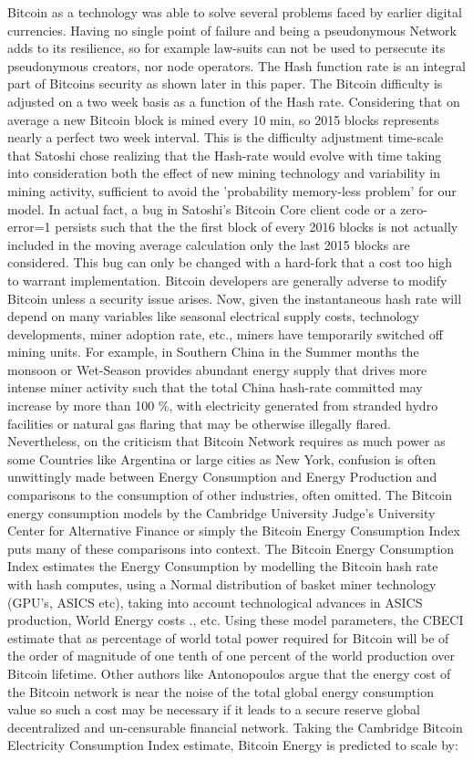 \documentclass[final,5p,times,twocolumn,authoryear]{elsarticle}
\begin{document}
Bitcoin as a technology was able to solve several problems faced by earlier digital currencies. Having no single point of failure and being a pseudonymous Network adds to its resilience, so for example law-suits can not be used to persecute its pseudonymous creators, nor node operators. The Hash function rate is an integral part of Bitcoins security as shown later in this paper. The Bitcoin difficulty is adjusted on a two week basis as a function of the Hash rate. Considering that on average a new Bitcoin block is mined every 10 min, so 2015 blocks represents nearly a perfect two week interval. This is the difficulty adjustment time-scale that Satoshi chose realizing that the Hash-rate would evolve with time taking into consideration both the effect of new mining technology and variability in mining activity, sufficient to avoid the 'probability memory-less problem' for our model. In actual fact, a bug in Satoshi's Bitcoin Core client code or a zero-error=1 persists such that the the first block of every 2016 blocks is not actually included in the moving average calculation only the last 2015 blocks are considered. This bug can only be changed with a hard-fork that a cost too high to warrant implementation. Bitcoin developers are generally adverse to modify Bitcoin unless a security issue arises. Now, given the instantaneous hash rate will depend on many variables like seasonal electrical supply costs, technology developments, miner adoption rate, etc., miners have temporarily switched off mining units. For example, in Southern China in the Summer months the monsoon or Wet-Season provides abundant energy supply that drives more intense miner activity such that the total China hash-rate committed may increase by more than 100 \%, with electricity generated from stranded hydro facilities or natural gas flaring that may be otherwise illegally flared. Nevertheless, on the criticism that Bitcoin Network requires as much power as some Countries like Argentina or large cities as New York, confusion is often unwittingly made between Energy Consumption and Energy Production and comparisons to the consumption of other industries, often omitted. The Bitcoin energy consumption models by the Cambridge University Judge's University Center for Alternative Finance or simply the Bitcoin Energy Consumption Index puts many of these comparisons into context. The Bitcoin Energy Consumption Index estimates the Energy Consumption by modelling the Bitcoin hash rate with hash computes, using a Normal distribution of basket miner technology (GPU's, ASICS etc), taking into account technological advances in ASICS production, World Energy costs ., etc. Using these model parameters, the CBECI estimate that as percentage of world total power required for Bitcoin will be of the order of magnitude of one tenth of one percent of the world production over Bitcoin lifetime. Other authors like Antonopoulos argue that the energy cost of the Bitcoin network is near the noise of the total global energy consumption value so such a cost may be necessary if it leads to a secure reserve global decentralized and un-censurable financial network. Taking the Cambridge Bitcoin Electricity Consumption Index estimate, Bitcoin Energy is predicted to scale by: 
\end{document}
